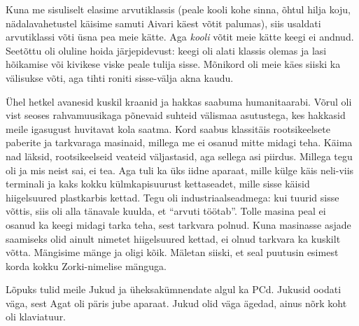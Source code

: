 Kuna me sisuliselt elasime arvutiklassis (peale kooli kohe sinna, õhtul 
hilja koju, nädalavahetustel käisime samuti Aivari käest võtit palumas), siis 
usaldati arvutiklassi võti üsna pea meie kätte. Aga \emph{kooli} võtit meie kätte keegi ei andnud. Seetõttu 
oli oluline hoida järjepidevust: keegi oli alati klassis olemas ja lasi hõikamise 
või kivikese viske peale tulija sisse. Mõnikord oli meie käes 
siiski ka välisukse võti, aga tihti roniti sisse-välja akna kaudu. 

Ühel hetkel avanesid kuskil kraanid ja hakkas saabuma humanitaarabi. Võrul oli vist seoses 
rahvamuusikaga põnevaid suhteid välismaa asutustega, kes hakkasid meile 
igasugust huvitavat kola saatma. Kord saabus klassitäis rootsikeelsete 
paberite ja tarkvaraga masinaid, millega me ei osanud mitte midagi teha. Käima 
nad läksid, rootsikeelseid veateid väljastasid, aga sellega asi piirdus. Millega tegu oli ja mis neist sai, 
ei tea. Aga tuli ka üks iidne aparaat, mille külge käis neli-viis 
terminali ja kaks kokku külmkapisuurust kettaseadet, mille sisse käisid 
hiigelsuured plastkarbis kettad. Tegu oli industriaalseadmega: kui tuurid sisse 
võttis, siis oli alla tänavale kuulda, et \enquote{arvuti töötab}. Tolle masina 
peal ei osanud ka keegi midagi tarka teha, sest tarkvara polnud. Kuna masinasse asjade saamiseks 
olid ainult nimetet hiigelsuured kettad, ei olnud tarkvara ka kuskilt võtta. Mängisime mänge 
ja oligi kõik. Mäletan siiski, et seal puutusin esimest korda 
kokku Zorki-nimelise mänguga.

Lõpuks tulid meile Jukud ja üheksakümnendate algul ka 
PCd. Jukusid oodati väga, sest Agat oli päris jube aparaat. 
Jukud olid väga ägedad, ainus nõrk koht oli 
klaviatuur. 

